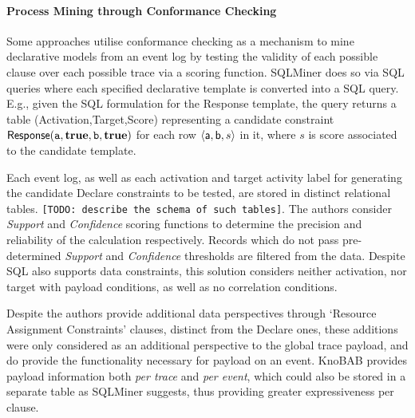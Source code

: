 \paragraph*{Process Mining through Conformance Checking}
Some approaches utilise conformance checking as a mechanism to mine declarative {models}  from an event log {by testing the validity of each possible clause over each possible trace} via a scoring function. SQLMiner \cite{SchonigRCJM16} {does so via} SQL queries \cite{Schonig15} {where e}ach specified declarative {template} %
{is} converted into a SQL query. E.g., given the SQL formulation for the \textsf{Response} template, the query returns a table \textsf{(Activation,Target,Score)} representing a candidate constraint $\textsf{Response}(\texttt{a},\textbf{true},\texttt{b},\textbf{true})$ for each row $\braket{\textsf{a},\textsf{b},s}$ in it, where $s$ is   score associated to the candidate template.

Each event log, as well as each activation and target activity label for generating the candidate Declare constraints to be tested, are stored in distinct relational tables. \texttt{\color{red}[TODO: describe the schema of such tables]}. The authors consider 
\emph{Support} and \emph{Confidence} scoring functions to determine the precision and reliability of the calculation respectively. Records which do not pass pre-determined \emph{Support} and \emph{Confidence} thresholds are filtered from the data. {Despite } SQL also supports data constraints, this solution considers neither activation, nor target %
with payload conditions, as well as no correlation conditions.

{Despite the authors } provide additional {data} perspectives through `Resource Assignment Constraints' clauses, distinct from the Declare ones, these additions were only considered as an additional perspective {to the global trace payload}, and do provide the functionality necessary for payload on an event.  KnoBAB provides payload information {both \emph{per trace}} and \emph{per event}, which could also be stored in a separate table as SQLMiner suggests, thus providing greater expressiveness per clause.

